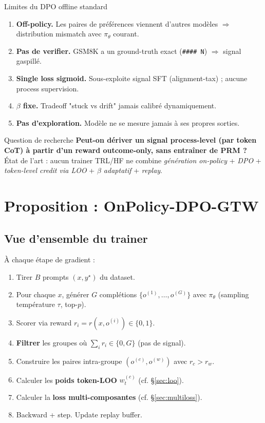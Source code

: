 \documentclass[10pt,a4paper]{article}
\begin{document}
\begin{caveat}{Limites du DPO offline standard}
\begin{enumerate}[leftmargin=*]
  \item \textbf{Off-policy.} Les paires de préférences viennent d'autres modèles $\Rightarrow$ distribution mismatch avec $\pi_\theta$ courant.
  \item \textbf{Pas de verifier.} GSM8K a un ground-truth exact (\texttt{\#\#\#\# N}) $\Rightarrow$ signal gaspillé.
  \item \textbf{Single loss sigmoid.} Sous-exploite signal SFT (alignment-tax) ; aucune process supervision.
  \item \textbf{$\beta$ fixe.} Tradeoff "stuck vs drift" jamais calibré dynamiquement.
  \item \textbf{Pas d'exploration.} Modèle ne se mesure jamais à ses propres sorties.
\end{enumerate}
\end{caveat}

\begin{idea}{Question de recherche}
\textbf{Peut-on dériver un signal process-level (par token CoT) à partir d'un reward outcome-only, sans entraîner de PRM ?}
\\[2pt]
État de l'art : aucun trainer TRL/HF ne combine \emph{génération on-policy} + \emph{DPO} + \emph{token-level credit via LOO} + \emph{$\beta$ adaptatif} + \emph{replay}.
\end{idea}

\section{Proposition : OnPolicy-DPO-GTW}

\subsection{Vue d'ensemble du trainer}

À chaque étape de gradient :

\begin{enumerate}[leftmargin=*]
  \item Tirer $B$ prompts $(x, y^\star)$ du dataset.
  \item Pour chaque $x$, générer $G$ complétions $\{o^{(1)}, \dots, o^{(G)}\}$ avec $\pi_\theta$ (sampling température $\tau$, top-$p$).
  \item Scorer via reward $r_i = r(x, o^{(i)}) \in \{0, 1\}$.
  \item \textbf{Filtrer} les groupes où $\sum_i r_i \in \{0, G\}$ (pas de signal).
  \item Construire les paires intra-groupe $(o^{(c)}, o^{(w)})$ avec $r_c > r_w$.
  \item Calculer les \textbf{poids token-LOO} $w_t^{(c)}$ (cf. \S\ref{sec:loo}).
  \item Calculer la \textbf{loss multi-composantes} (cf. \S\ref{sec:multiloss}).
  \item Backward + step. Update replay buffer.
\end{enumerate}
\end{document}

